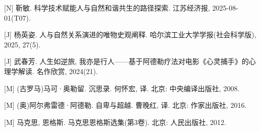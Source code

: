 \documentclass[a4paper,12pt]{ctexart}
\begin{document}
\begin{PaperBib}
    \item {[N]} 靳敏. 科学技术赋能人与自然和谐共生的路径探索. 江苏经济报, 2025-08-01(T07).
    \item {[J]} 杨英姿. 人与自然关系演进的唯物史观阐释. 哈尔滨工业大学学报(社会科学版), 2025, 27(5).
    \item {[J]} 武春芳. 人生如逆旅, 我亦是行人——基于阿德勒疗法对电影《心灵捕手》的心理学解读. 名作欣赏, 2024(21).
    \item {[M]} (古罗马)马可·奥勒留. 沉思录. 何怀宏, 译. 北京: 中央编译出版社, 2008.
    \item {[M]} (奥)阿尔弗雷德·阿德勒. 自卑与超越. 曹晚红, 译. 北京: 作家出版社, 2016.
    \item {[M]} 马克思, 恩格斯. 马克思恩格斯选集(第3卷). 北京: 人民出版社, 2012.
\end{PaperBib}

\makeBio
\end{document}
